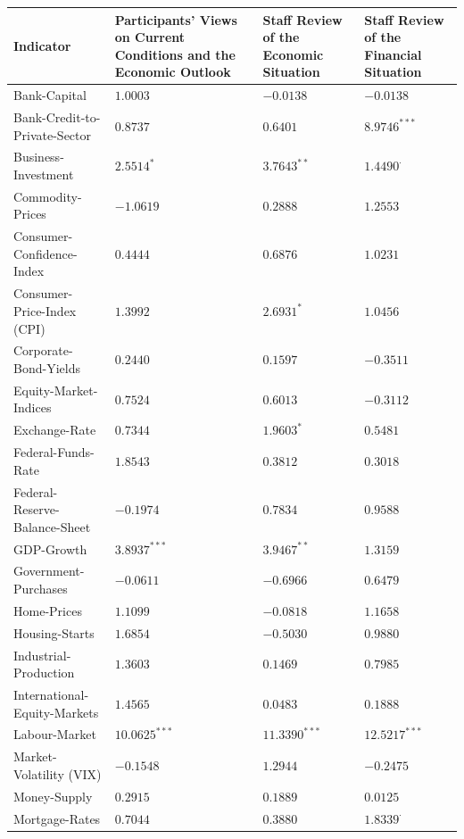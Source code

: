 \begin{table}[htbp]
\centering
\scriptsize
\begin{threeparttable}
\begin{tabular}{p{3.6cm} p{4.3cm} p{3.1cm} p{3.1cm}}
\toprule
\textbf{Indicator} & 
\textbf{Participants' Views on Current Conditions and the Economic Outlook} & 
\textbf{Staff Review of the Economic Situation} & 
\textbf{Staff Review of the Financial Situation} \\
\midrule
Bank-Capital & $1.0003$ & $-0.0138$ & $-0.0138$ \\
Bank-Credit-to-Private-Sector & $0.8737$ & $0.6401$ & $\mathbf{8.9746^{***}}$ \\
Business-Investment & $2.5514^{*}$ & $\mathbf{3.7643^{**}}$ & $1.4490^{\cdot}$ \\
Commodity-Prices & $-1.0619$ & $0.2888$ & $1.2553$ \\
Consumer-Confidence-Index & $0.4444$ & $0.6876$ & $1.0231$ \\
Consumer-Price-Index (CPI) & $1.3992$ & $\mathbf{2.6931^{*}}$ & $1.0456$ \\
Corporate-Bond-Yields & $0.2440$ & $0.1597$ & $-0.3511$ \\
Equity-Market-Indices & $0.7524$ & $0.6013$ & $-0.3112$ \\
Exchange-Rate & $0.7344$ & $\mathbf{1.9603^{*}}$ & $0.5481$ \\
Federal-Funds-Rate & $1.8543$ & $0.3812$ & $0.3018$ \\
Federal-Reserve-Balance-Sheet & $-0.1974$ & $0.7834$ & $0.9588$ \\
GDP-Growth & $\mathbf{3.8937^{***}}$ & $\mathbf{3.9467^{**}}$ & $1.3159$ \\
Government-Purchases & $-0.0611$ & $-0.6966$ & $0.6479$ \\
Home-Prices & $1.1099$ & $-0.0818$ & $1.1658$ \\
Housing-Starts & $1.6854$ & $-0.5030$ & $0.9880$ \\
Industrial-Production & $1.3603$ & $0.1469$ & $0.7985$ \\
International-Equity-Markets & $1.4565$ & $0.0483$ & $0.1888$ \\
Labour-Market & $\mathbf{10.0625^{***}}$ & $\mathbf{11.3390^{***}}$ & $\mathbf{12.5217^{***}}$ \\
Market-Volatility (VIX) & $-0.1548$ & $1.2944$ & $-0.2475$ \\
Money-Supply & $0.2915$ & $0.1889$ & $0.0125$ \\
Mortgage-Rates & $0.7044$ & $0.3880$ & $\mathbf{1.8339^{\cdot}}$ \\

\end{tabular}
\end{threeparttable}
\end{table}
